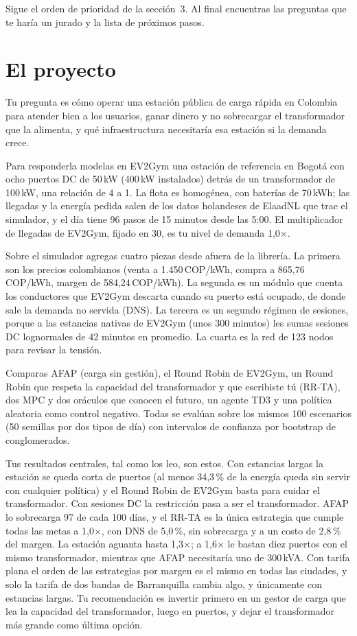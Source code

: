 \documentclass[11pt]{article}
\begin{document}
Sigue el orden de prioridad de la sección~3. Al final encuentras las preguntas que te haría un jurado y la lista de próximos pasos.

\section{El proyecto}


Tu pregunta es cómo operar una estación pública de carga rápida en Colombia para atender bien a los usuarios, ganar dinero y no sobrecargar el transformador que la alimenta, y qué infraestructura necesitaría esa estación si la demanda crece.

Para responderla modelas en EV2Gym una estación de referencia en Bogotá con ocho puertos DC de 50\,kW (400\,kW instalados) detrás de un transformador de 100\,kW, una relación de 4 a 1. La flota es homogénea, con baterías de 70\,kWh; las llegadas y la energía pedida salen de los datos holandeses de ElaadNL que trae el simulador, y el día tiene 96 pasos de 15 minutos desde las 5:00. El multiplicador de llegadas de EV2Gym, fijado en 30, es tu nivel de demanda 1,0×.

Sobre el simulador agregas cuatro piezas desde afuera de la librería. La primera son los precios colombianos (venta a 1.450\,COP/kWh, compra a 865,76\,COP/kWh, margen de 584,24\,COP/kWh). La segunda es un módulo que cuenta los conductores que EV2Gym descarta cuando su puerto está ocupado, de donde sale la demanda no servida (DNS). La tercera es un segundo régimen de sesiones, porque a las estancias nativas de EV2Gym (unos 300 minutos) les sumas sesiones DC lognormales de 42 minutos en promedio. La cuarta es la red de 123 nodos para revisar la tensión.

Comparas AFAP (carga sin gestión), el Round Robin de EV2Gym, un Round Robin que respeta la capacidad del transformador y que escribiste tú (RR-TA), dos MPC y dos oráculos que conocen el futuro, un agente TD3 y una política aleatoria como control negativo. Todas se evalúan sobre los mismos 100 escenarios (50 semillas por dos tipos de día) con intervalos de confianza por bootstrap de conglomerados.

Tus resultados centrales, tal como los leo, son estos. Con estancias largas la estación se queda corta de puertos (al menos 34,3\,\% de la energía queda sin servir con cualquier política) y el Round Robin de EV2Gym basta para cuidar el transformador. Con sesiones DC la restricción pasa a ser el transformador. AFAP lo sobrecarga 97 de cada 100 días, y el RR-TA es la única estrategia que cumple todas las metas a 1,0×, con DNS de 5,0\,\%, sin sobrecarga y a un costo de 2,8\,\% del margen. La estación aguanta hasta 1,3×; a 1,6× le bastan diez puertos con el mismo transformador, mientras que AFAP necesitaría uno de 300\,kVA. Con tarifa plana el orden de las estrategias por margen es el mismo en todas las ciudades, y solo la tarifa de dos bandas de Barranquilla cambia algo, y únicamente con estancias largas. Tu recomendación es invertir primero en un gestor de carga que lea la capacidad del transformador, luego en puertos, y dejar el transformador más grande como última opción.
\end{document}
